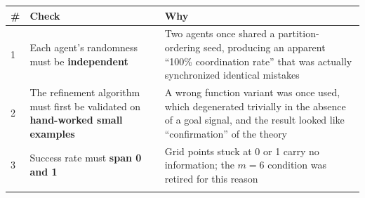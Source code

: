 \documentclass[11pt]{article}
\begin{document}
\begin{longtable}[]{@{}lll@{}}
\toprule
\begin{minipage}[b]{0.30\columnwidth}\raggedright
\#\strut
\end{minipage} & \begin{minipage}[b]{0.30\columnwidth}\raggedright
Check\strut
\end{minipage} & \begin{minipage}[b]{0.30\columnwidth}\raggedright
Why\strut
\end{minipage}\tabularnewline
\midrule
\endhead
\begin{minipage}[t]{0.30\columnwidth}\raggedright
1\strut
\end{minipage} & \begin{minipage}[t]{0.30\columnwidth}\raggedright
Each agent's randomness must be \textbf{independent}\strut
\end{minipage} & \begin{minipage}[t]{0.30\columnwidth}\raggedright
Two agents once shared a partition-ordering seed, producing an apparent ``100\% coordination rate'' that was actually synchronized identical mistakes\strut
\end{minipage}\tabularnewline
\begin{minipage}[t]{0.30\columnwidth}\raggedright
2\strut
\end{minipage} & \begin{minipage}[t]{0.30\columnwidth}\raggedright
The refinement algorithm must first be validated on \textbf{hand-worked small examples}\strut
\end{minipage} & \begin{minipage}[t]{0.30\columnwidth}\raggedright
A wrong function variant was once used, which degenerated trivially in the absence of a goal signal, and the result looked like ``confirmation'' of the theory\strut
\end{minipage}\tabularnewline
\begin{minipage}[t]{0.30\columnwidth}\raggedright
3\strut
\end{minipage} & \begin{minipage}[t]{0.30\columnwidth}\raggedright
Success rate must \textbf{span 0 and 1}\strut
\end{minipage} & \begin{minipage}[t]{0.30\columnwidth}\raggedright
Grid points stuck at 0 or 1 carry no information; the \(m=6\) condition was retired for this reason\strut
\end{minipage}\tabularnewline
\begin{minipage}[t]{0.30\columnwidth}\raggedright

\end{minipage}
\end{longtable}
\end{document}

